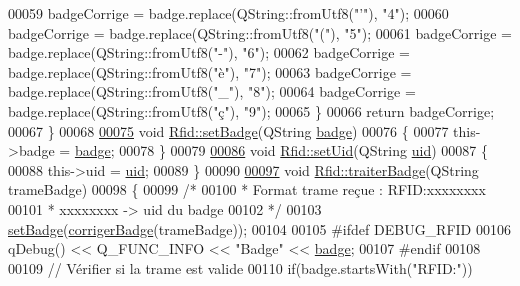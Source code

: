 \begin{DoxyCode}
00059         badgeCorrige = badge.replace(QString::fromUtf8(\textcolor{stringliteral}{"'"}), \textcolor{stringliteral}{"4"});
00060         badgeCorrige = badge.replace(QString::fromUtf8(\textcolor{stringliteral}{"("}), \textcolor{stringliteral}{"5"});
00061         badgeCorrige = badge.replace(QString::fromUtf8(\textcolor{stringliteral}{"-"}), \textcolor{stringliteral}{"6"});
00062         badgeCorrige = badge.replace(QString::fromUtf8(\textcolor{stringliteral}{"è"}), \textcolor{stringliteral}{"7"});
00063         badgeCorrige = badge.replace(QString::fromUtf8(\textcolor{stringliteral}{"\_"}), \textcolor{stringliteral}{"8"});
00064         badgeCorrige = badge.replace(QString::fromUtf8(\textcolor{stringliteral}{"ç"}), \textcolor{stringliteral}{"9"});
00065     \}
00066     \textcolor{keywordflow}{return} badgeCorrige;
00067 \}
00068 
\hyperlink{class_rfid_a51021c0899dab1d5fb08e3dd6d93e425}{00075} \textcolor{keywordtype}{void} \hyperlink{class_rfid_a51021c0899dab1d5fb08e3dd6d93e425}{Rfid::setBadge}(QString \hyperlink{class_rfid_ac634cd26ffbe1c6da3967dc4af53b734}{badge})
00076 \{
00077     this->badge = \hyperlink{class_rfid_ac634cd26ffbe1c6da3967dc4af53b734}{badge};
00078 \}
00079 
\hyperlink{class_rfid_ac79b994b32bf7a7cbad9d9988e721564}{00086} \textcolor{keywordtype}{void} \hyperlink{class_rfid_ac79b994b32bf7a7cbad9d9988e721564}{Rfid::setUid}(QString \hyperlink{class_rfid_a157b71d282a7e067c65b431dbae6c6c8}{uid})
00087 \{
00088     this->uid = \hyperlink{class_rfid_a157b71d282a7e067c65b431dbae6c6c8}{uid};
00089 \}
00090 
\hyperlink{class_rfid_a5b4f31b235afebee620e42c52ab60213}{00097} \textcolor{keywordtype}{void} \hyperlink{class_rfid_a5b4f31b235afebee620e42c52ab60213}{Rfid::traiterBadge}(QString trameBadge)
00098 \{
00099     \textcolor{comment}{/*}
00100 \textcolor{comment}{     * Format trame reçue : RFID:xxxxxxxx}
00101 \textcolor{comment}{     * xxxxxxxx -> uid du badge}
00102 \textcolor{comment}{     */}
00103     \hyperlink{class_rfid_a51021c0899dab1d5fb08e3dd6d93e425}{setBadge}(\hyperlink{class_rfid_afb99366646ac75b7e1d28302d38bf4f2}{corrigerBadge}(trameBadge));    
00104 
00105 \textcolor{preprocessor}{    #ifdef DEBUG\_RFID}
00106         qDebug() << Q\_FUNC\_INFO << \textcolor{stringliteral}{"Badge"} << \hyperlink{class_rfid_ac634cd26ffbe1c6da3967dc4af53b734}{badge};
00107 \textcolor{preprocessor}{    #endif}
00108 
00109     \textcolor{comment}{// Vérifier si la trame est valide}
00110     \textcolor{keywordflow}{if}(badge.startsWith(\textcolor{stringliteral}{"RFID:"}))

\end{DoxyCode}
